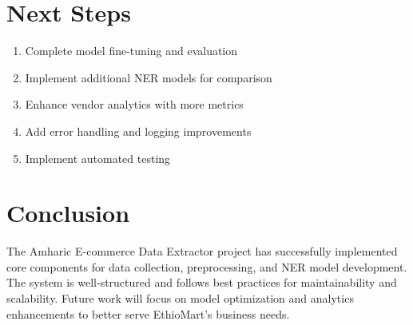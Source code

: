 \documentclass[12pt,a4paper]{article}
\begin{document}
\section{Next Steps}

\begin{enumerate}
    \item Complete model fine-tuning and evaluation
    \item Implement additional NER models for comparison
    \item Enhance vendor analytics with more metrics
    \item Add error handling and logging improvements
    \item Implement automated testing
\end{enumerate}

\section{Conclusion}

The Amharic E-commerce Data Extractor project has successfully implemented core components for data collection, preprocessing, and NER model development. The system is well-structured and follows best practices for maintainability and scalability. Future work will focus on model optimization and analytics enhancements to better serve EthioMart's business needs.
\end{document}
